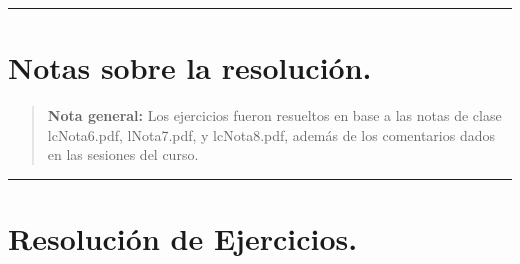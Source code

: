 \documentclass[12pt,letterpaper]{article}
\begin{document}
\bigskip
\hrule height 0.1pt
\bigskip

\section*{Notas sobre la resolución.}

\begin{quote}
  \textbf{Nota general:} Los ejercicios fueron resueltos en base a las notas de clase lcNota6.pdf, lNota7.pdf, y lcNota8.pdf, además de los comentarios dados en las sesiones del curso.
\end{quote}

\bigskip
\hrule height 0.1pt
\bigskip

\section*{Resolución de Ejercicios.}
\end{document}
